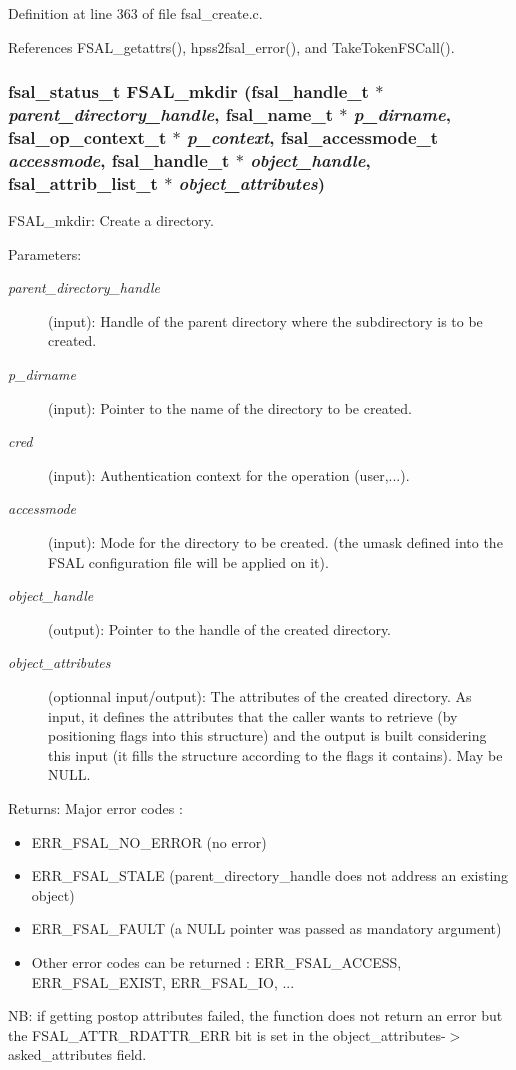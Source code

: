 Definition at line 363 of file fsal\_\-create.c.

References FSAL\_\-getattrs(), hpss2fsal\_\-error(), and Take\-Token\-FSCall().
\subsubsection{\setlength{\rightskip}{0pt plus 5cm}fsal\_\-status\_\-t FSAL\_\-mkdir (fsal\_\-handle\_\-t $\ast$ {\em parent\_\-directory\_\-handle}, fsal\_\-name\_\-t $\ast$ {\em p\_\-dirname}, fsal\_\-op\_\-context\_\-t $\ast$ {\em p\_\-context}, fsal\_\-accessmode\_\-t {\em accessmode}, fsal\_\-handle\_\-t $\ast$ {\em object\_\-handle}, fsal\_\-attrib\_\-list\_\-t $\ast$ {\em object\_\-attributes})}\label{fsal__create_8c_a1}


FSAL\_\-mkdir: Create a directory.

\begin{Desc}
\item[Parameters:]
\begin{description}
\item[{\em parent\_\-directory\_\-handle}](input): Handle of the parent directory where the subdirectory is to be created. \item[{\em p\_\-dirname}](input): Pointer to the name of the directory to be created. \item[{\em cred}](input): Authentication context for the operation (user,...). \item[{\em accessmode}](input): Mode for the directory to be created. (the umask defined into the FSAL configuration file will be applied on it). \item[{\em object\_\-handle}](output): Pointer to the handle of the created directory. \item[{\em object\_\-attributes}](optionnal input/output): The attributes of the created directory. As input, it defines the attributes that the caller wants to retrieve (by positioning flags into this structure) and the output is built considering this input (it fills the structure according to the flags it contains). May be NULL.\end{description}
\end{Desc}
\begin{Desc}
\item[Returns:]Major error codes :\begin{itemize}
\item ERR\_\-FSAL\_\-NO\_\-ERROR (no error)\item ERR\_\-FSAL\_\-STALE (parent\_\-directory\_\-handle does not address an existing object)\item ERR\_\-FSAL\_\-FAULT (a NULL pointer was passed as mandatory argument)\item Other error codes can be returned : ERR\_\-FSAL\_\-ACCESS, ERR\_\-FSAL\_\-EXIST, ERR\_\-FSAL\_\-IO, ...\end{itemize}
\end{Desc}
NB: if getting postop attributes failed, the function does not return an error but the FSAL\_\-ATTR\_\-RDATTR\_\-ERR bit is set in the object\_\-attributes-$>$asked\_\-attributes field. 

